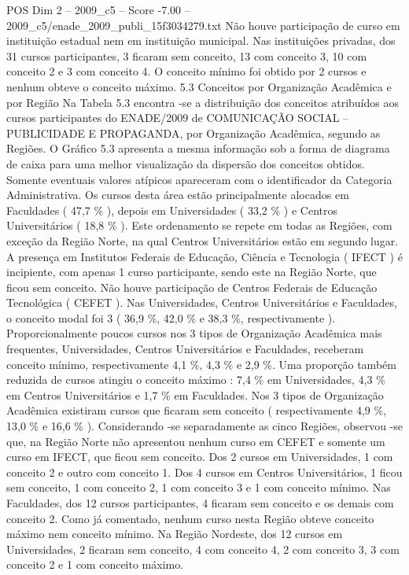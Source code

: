 \begin{textsample}{POS Dim 2 – 2009\_c5 – Score -7.00 – 2009\_c5/enade\_2009\_publi\_15f3034279.txt}
Não houve participação de curso em instituição estadual nem em instituição municipal.
Nas instituições privadas, dos 31 cursos participantes, 3 ficaram sem conceito, 13 com conceito 3, 10 com conceito 2 e 3 com conceito 4.
O conceito mínimo foi obtido por 2 cursos e nenhum obteve o conceito máximo. 5.3 Conceitos por Organização Acadêmica e por Região Na Tabela 5.3 encontra -se a distribuição dos conceitos atribuídos aos cursos participantes do ENADE/2009 de COMUNICAÇÃO SOCIAL – PUBLICIDADE E PROPAGANDA, por Organização Acadêmica, segundo as Regiões.
O Gráfico 5.3 apresenta a mesma informação sob a forma de diagrama de caixa para uma melhor visualização da dispersão dos conceitos obtidos.
Somente eventuais valores atípicos apareceram com o identificador da Categoria Administrativa.
Os cursos desta área estão principalmente alocados em Faculdades ( 47,7 \% ), depois em Universidades ( 33,2 \% ) e Centros Universitários ( 18,8 \% ).
Este ordenamento se repete em todas as Regiões, com exceção da Região Norte, na qual Centros Universitários estão em segundo lugar.
A presença em Institutos Federais de Educação, Ciência e Tecnologia ( IFECT ) é incipiente, com apenas 1 curso participante, sendo este na Região Norte, que ficou sem conceito.
Não houve participação de Centros Federais de Educação Tecnológica ( CEFET ).
Nas Universidades, Centros Universitários e Faculdades, o conceito modal foi 3 ( 36,9 \%, 42,0 \% e 38,3 \%, respectivamente ).
Proporcionalmente poucos cursos nos 3 tipos de Organização Acadêmica mais frequentes, Universidades, Centros Universitários e Faculdades, receberam conceito mínimo, respectivamente 4,1 \%, 4,3 \% e 2,9 \%.
Uma proporção também reduzida de cursos atingiu o conceito máximo : 7,4 \% em Universidades, 4,3 \% em Centros Universitários e 1,7 \% em Faculdades.
Nos 3 tipos de Organização Acadêmica existiram cursos que ficaram sem conceito ( respectivamente 4,9 \%, 13,0 \% e 16,6 \% ).
Considerando -se separadamente as cinco Regiões, observou -se que, na Região Norte não apresentou nenhum curso em CEFET e somente um curso em IFECT, que ficou sem conceito.
Dos 2 cursos em Universidades, 1 com conceito 2 e outro com conceito 1.
Dos 4 cursos em Centros Universitários, 1 ficou sem conceito, 1 com conceito 2, 1 com conceito 3 e 1 com conceito mínimo.
Nas Faculdades, dos 12 cursos participantes, 4 ficaram sem conceito e os demais com conceito 2.
Como já comentado, nenhum curso nesta Região obteve conceito máximo nem conceito mínimo.
Na Região Nordeste, dos 12 cursos em Universidades, 2 ficaram sem conceito, 4 com conceito 4, 2 com conceito 3, 3 com conceito 2 e 1 com conceito máximo.

\end{textsample}
